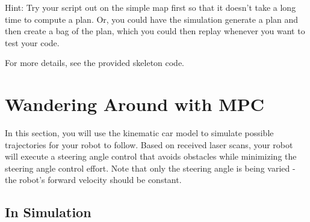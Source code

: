 \documentclass[final]{article}
\begin{document}
Hint: Try your script out on the simple map first so that it doesn't take a long time to compute a plan. Or, you could have the simulation generate a plan and then create a bag of the plan, which you could then replay whenever you want to test your code.

For more details, see the provided skeleton code.

\section{Wandering Around with MPC}

In this section, you will use the kinematic car model to simulate possible trajectories for your robot to follow. Based on received laser scans, your robot will execute a steering angle control that avoids obstacles while minimizing the steering angle control effort. Note that only the steering angle is being varied - the robot's forward velocity should be constant.

\subsection{In Simulation}
\end{document}

